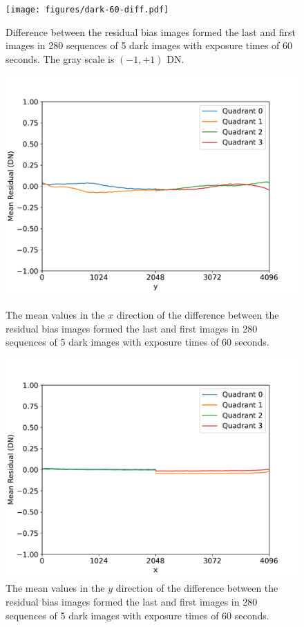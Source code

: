\documentclass{article}
\begin{document}
\begin{figure}[pb]
\begin{center}
\texttt{[image: figures/dark-60-diff.pdf]}
\medskip
\caption{Difference between the residual bias images formed the last and first images in 280 sequences of 5 dark images with exposure times of 60 seconds. The gray scale is $(-1,+1)$ DN.}
\label{figure:dark-60-diff}
\end{center}
\end{figure}

\begin{figure}[pb]
\begin{center}
\includegraphics[width=0.7\columnwidth]{figures/dark-60-diff-y.pdf}
\medskip
\caption{The mean values in the $x$ direction of the difference between the residual bias images formed the last and first images in 280 sequences of 5 dark images with exposure times of 60 seconds.}
\label{figure:dark-60-diff-y}
\end{center}
\begin{center}
\includegraphics[width=0.7\columnwidth]{figures/dark-60-diff-x.pdf}
\medskip
\caption{The mean values in the $y$ direction of the difference between the residual bias images formed the last and first images in 280 sequences of 5 dark images with exposure times of 60 seconds.}
\label{figure:dark-60-diff-x}
\end{center}
\end{figure}
\end{document}

